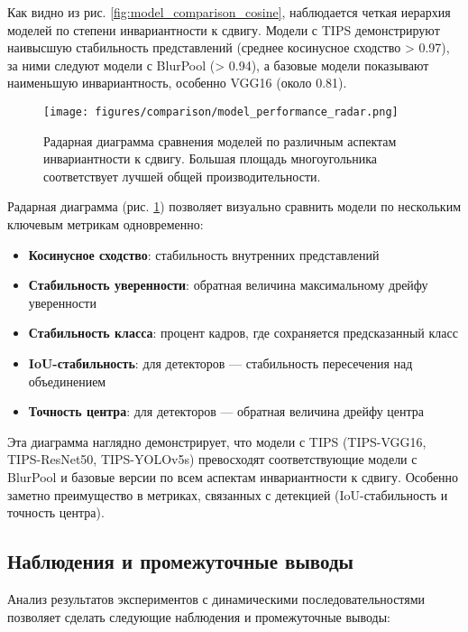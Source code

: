 Как видно из рис. \ref{fig:model_comparison_cosine}, наблюдается четкая иерархия моделей по степени инвариантности к сдвигу. Модели с TIPS демонстрируют наивысшую стабильность представлений (среднее косинусное сходство > 0.97), за ними следуют модели с BlurPool (> 0.94), а базовые модели показывают наименьшую инвариантность, особенно VGG16 (около 0.81).

\begin{figure}[ht]
\centering
\texttt{[image: figures/comparison/model\_performance\_radar.png]}
\caption{Радарная диаграмма сравнения моделей по различным аспектам инвариантности к сдвигу. Большая площадь многоугольника соответствует лучшей общей производительности.}
\label{fig:model_performance_radar}
\end{figure}

Радарная диаграмма (рис. \ref{fig:model_performance_radar}) позволяет визуально сравнить модели по нескольким ключевым метрикам одновременно:

\begin{itemize}
    \item \textbf{Косинусное сходство}: стабильность внутренних представлений
    \item \textbf{Стабильность уверенности}: обратная величина максимальному дрейфу уверенности
    \item \textbf{Стабильность класса}: процент кадров, где сохраняется предсказанный класс
    \item \textbf{IoU-стабильность}: для детекторов — стабильность пересечения над объединением
    \item \textbf{Точность центра}: для детекторов — обратная величина дрейфу центра
\end{itemize}

Эта диаграмма наглядно демонстрирует, что модели с TIPS (TIPS-VGG16, TIPS-ResNet50, TIPS-YOLOv5s) превосходят соответствующие модели с BlurPool и базовые версии по всем аспектам инвариантности к сдвигу. Особенно заметно преимущество в метриках, связанных с детекцией (IoU-стабильность и точность центра).

\subsection{Наблюдения и промежуточные выводы}
\label{experiments:dynamic:observations}

Анализ результатов экспериментов с динамическими последовательностями позволяет сделать следующие наблюдения и промежуточные выводы:

